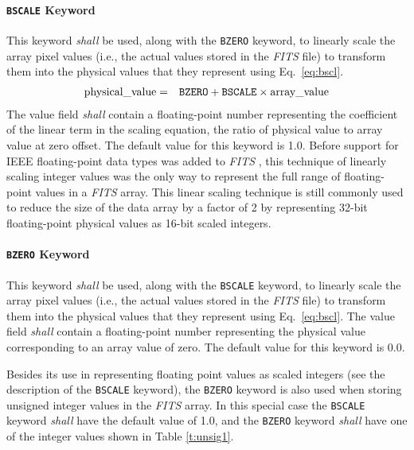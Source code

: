 \documentclass[11pt,makeidx]{book}     %
\begin{document}
   \paragraph{{\tt BSCALE} Keyword} 
   This keyword {\em shall} be used, along with the {\tt BZERO}
 keyword, to linearly scale the array pixel values (i.e., the
 actual values stored in the {\em FITS\/} file) to transform them
 into the physical values that they
 represent using Eq.\ \ref{eq:bscl}. 
 \begin{eqnarray}  
  \mbox{physical\_value} & = & \mbox{{\tt BZERO}} + 
                               \mbox{{\tt BSCALE}}
                              \times \mbox{array\_value} \label{eq:bscl}
\end{eqnarray}
 The value field {\em shall}
 contain a floating-point number representing the coefficient of
 the linear term in the scaling equation, the ratio of physical
 value to array value at zero offset.  The
 default value for this keyword is 1.0.  Before support for IEEE
 floating-point data types was added to {\em FITS\/} \cite{wells90}, this 
 technique of linearly scaling integer values was the only way to 
 represent the full range of floating-point values
 in a {\em FITS\/} array.   This linear scaling technique is still commonly used 
 to reduce the size of the data array by a factor of 2 by representing 
 32-bit floating-point physical values as 16-bit scaled integers.

  \paragraph{{\tt BZERO} Keyword} 
  This keyword {\em shall} be used, along with the {\tt BSCALE}
 keyword, to linearly scale the array pixel values (i.e., the
 actual values stored in the {\em FITS\/} file) to transform them
 into the physical  values that they
 represent using Eq.\ \ref{eq:bscl}. The value field {\em shall}
 contain a floating-point number representing the physical value
 corresponding to an array value of zero.  The default value for
 this  keyword is 0.0. 

 Besides its use in representing floating point values as scaled
 integers (see the description of the {\tt BSCALE} keyword), 
 the {\tt BZERO} keyword is also used when storing unsigned integer
 values in the {\em FITS\/} array. In this special case the {\tt BSCALE} 
 keyword {\em shall}
 have the default value of 1.0, and the {\tt BZERO} keyword
 {\em shall} have one of the integer values shown in Table \ref{t:unsig1}.
 
\end{document}
